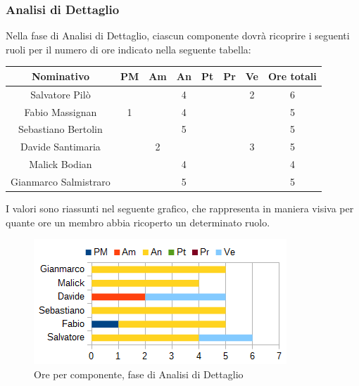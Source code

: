 		\subsubsection{Analisi di Dettaglio}
		Nella fase di Analisi di Dettaglio, ciascun componente dovrà ricoprire i seguenti ruoli per il numero di ore indicato nella seguente tabella: \\
		\begin{table}[H]
		\centering
		\begin{tabular}{|c|c|c|c|c|c|c|c|}
			\hline
			\textbf{Nominativo}		& \textbf{PM}	& \textbf{Am}	& \textbf{An}	& \textbf{Pt}	& \textbf{Pr}	& \textbf{Ve}	& \textbf{Ore totali}     \\
			\hline
			Salvatore Pilò			&		& 		& 4		&		&		& 2		& 6 \\
			Fabio Massignan			& 1		& 		& 4		&		&		& 		& 5 \\
			Sebastiano Bertolin		&		& 		& 5		&		&		&		& 5 \\
			Davide Santimaria		&		& 2		&		&		&		& 3		& 5 \\
			Malick Bodian			& 		& 		& 4		&		&		& 		& 4 \\
			Gianmarco Salmistraro	&		& 		& 5		&		&		& 		& 5 \\
			\hline
		\end{tabular}
		\end{table}
		I valori sono riassunti nel seguente grafico, che rappresenta in maniera visiva per quante ore un membro abbia ricoperto un determinato ruolo. \\
		\begin{figure}[H]
			\centering
			\includegraphics[scale=1]{immagini/grafici/analisi_dettaglio-barra.png}
			\caption{Ore per componente, fase di Analisi di Dettaglio}
		\end{figure}
